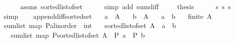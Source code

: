 \begin{isabellebody}
\ \ \ \ \isamarkupfalse%
\ assms\ sorted{\isacharunderscore}{\kern0pt}list{\isacharunderscore}{\kern0pt}of{\isacharunderscore}{\kern0pt}set{\isacharparenleft}{\kern0pt}{}{\isacharparenright}{\kern0pt}\isanewline
\ \ \ \ \isamarkupfalse%
\ {\isacharparenleft}{\kern0pt}simp\ add{\isacharcolon}{\kern0pt}\ sum{\isacharunderscore}{\kern0pt}diff{}{\isacharparenright}{\kern0pt}\ \isanewline
\ \ \isamarkupfalse%
\ {\isacharquery}{\kern0pt}thesis\isanewline
\ \ \ \ \isamarkupfalse%
\ s{\isacharunderscore}{\kern0pt}{}\ s{\isacharunderscore}{\kern0pt}{}\ s{\isacharunderscore}{\kern0pt}{}\ \isamarkupfalse%
\ simp\isanewline
{}\isamarkupfalse%
%
\endisatagproof
{\isafoldproof}%
%
\isadelimproof
\ \ \isanewline
%
\endisadelimproof
\isanewline
\isanewline
{}\isamarkupfalse%
\ append{\isacharunderscore}{\kern0pt}diff{\isacharunderscore}{\kern0pt}sorted{\isacharunderscore}{\kern0pt}set{}{\isacharcolon}{\kern0pt}\isanewline
\ \ \ {\isachardoublequoteopen}a\ {\isasymin}\ A{\isachardoublequoteclose}\isanewline
\ \ \ {\isachardoublequoteopen}b\ {\isasymin}\ A{\isachardoublequoteclose}\isanewline
\ \ \ {\isachardoublequoteopen}a\ {\isasymnoteq}\ b{\isachardoublequoteclose}\isanewline
\ \ \ {\isachardoublequoteopen}finite\ A{\isachardoublequoteclose}\isanewline
{}\ {\isachardoublequoteopen}sum{\isacharunderscore}{\kern0pt}list\ {\isacharparenleft}{\kern0pt}{\isacharparenleft}{\kern0pt}map\ {\isacharparenleft}{\kern0pt}P{\isacharcolon}{\kern0pt}{\isacharcolon}{\kern0pt}{\isacharparenleft}{\kern0pt}{\isacharprime}{\kern0pt}a{\isacharcolon}{\kern0pt}{\isacharcolon}{\kern0pt}linorder\ {\isasymRightarrow}\ int{\isacharparenright}{\kern0pt}{\isacharparenright}{\kern0pt}{\isacharparenright}{\kern0pt}\isanewline
\ \ \ {\isacharparenleft}{\kern0pt}sorted{\isacharunderscore}{\kern0pt}list{\isacharunderscore}{\kern0pt}of{\isacharunderscore}{\kern0pt}set\ {\isacharparenleft}{\kern0pt}A\ {\isacharminus}{\kern0pt}\ {\isacharbraceleft}{\kern0pt}a{\isacharbraceright}{\kern0pt}\ {\isacharminus}{\kern0pt}\ {\isacharbraceleft}{\kern0pt}b{\isacharbraceright}{\kern0pt}{\isacharparenright}{\kern0pt}{\isacharparenright}{\kern0pt}{\isacharparenright}{\kern0pt}\ \isanewline
\ \ {\isacharequal}{\kern0pt}\ sum{\isacharunderscore}{\kern0pt}list\ {\isacharparenleft}{\kern0pt}{\isacharparenleft}{\kern0pt}map\ P{\isacharparenright}{\kern0pt}{\isacharparenleft}{\kern0pt}sorted{\isacharunderscore}{\kern0pt}list{\isacharunderscore}{\kern0pt}of{\isacharunderscore}{\kern0pt}set\ {\isacharparenleft}{\kern0pt}A{\isacharparenright}{\kern0pt}{\isacharparenright}{\kern0pt}{\isacharparenright}{\kern0pt}\ {\isacharminus}{\kern0pt}\ {\isacharparenleft}{\kern0pt}P\ a{\isacharparenright}{\kern0pt}\ {\isacharminus}{\kern0pt}\ {\isacharparenleft}{\kern0pt}P\ b{\isacharparenright}{\kern0pt}{\isachardoublequoteclose}\isanewline

\end{isabellebody}
